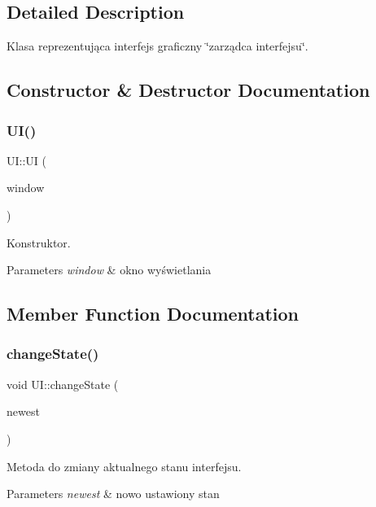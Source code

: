 \subsection{Detailed Description}
Klasa reprezentująca interfejs graficzny \char`\"{}zarządca interfejsu\char`\"{}. 

\subsection{Constructor \& Destructor Documentation}
\mbox{\label{class_u_i_afbd1850b7e5e8627a0d5f3897cf65bea}} 
\subsubsection{\texorpdfstring{UI()}{UI()}}
{\footnotesize\ttfamily U\+I\+::\+UI (\begin{DoxyParamCaption}\item[{Render\+Window \&}]{window }\end{DoxyParamCaption})}



Konstruktor. 


\begin{DoxyParams}{Parameters}
{\em window} & okno wyświetlania \\
\hline
\end{DoxyParams}


\subsection{Member Function Documentation}
\mbox{\label{class_u_i_aaf58d768dcc0d9a2d55e87e1a02f853e}} 
\subsubsection{\texorpdfstring{changeState()}{changeState()}}
{\footnotesize\ttfamily void U\+I\+::change\+State (\begin{DoxyParamCaption}\item[{U\+I\+State}]{newest }\end{DoxyParamCaption})}



Metoda do zmiany aktualnego stanu interfejsu. 


\begin{DoxyParams}{Parameters}
{\em newest} & nowo ustawiony stan \\
\hline
\end{DoxyParams}
\mbox{\label{class_u_i_a30ed84234a73dff1092674459f36d6f4}} 
